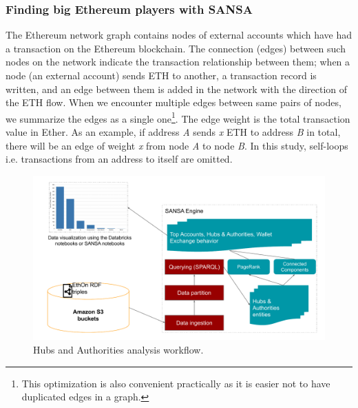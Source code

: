 \subsubsection{Finding big Ethereum players with SANSA}
The Ethereum network graph contains nodes of external accounts which have had a transaction on the Ethereum blockchain.
The connection (edges) between such nodes on the network indicate the transaction relationship between them; when a node (an external account) sends ETH to another, a transaction record is written, and an edge between them is added in the network with the direction of the ETH flow. When we encounter multiple edges between same pairs of nodes, we summarize the edges as a single one\footnote{This optimization is also convenient practically as it is easier not to have duplicated edges in a graph.}. The edge weight is the total transaction value in Ether.
As an example, if address \emph{A} sends \emph{x} ETH to address \emph{B} in total, there will be an edge of weight \emph{x} from node \emph{A} to node \emph{B}. 
In this study, self-loops i.e. transactions from an address to itself are omitted.

\begin{figure}
\centering
\includegraphics[width=1.0\columnwidth]{images/7_implemenation_and_usecases/hub-and-authorities-system-architecture.pdf}
\caption{Hubs and Authorities analysis workflow.}
\label{fig:hub-and-authorities-system-architecture}
\end{figure}

